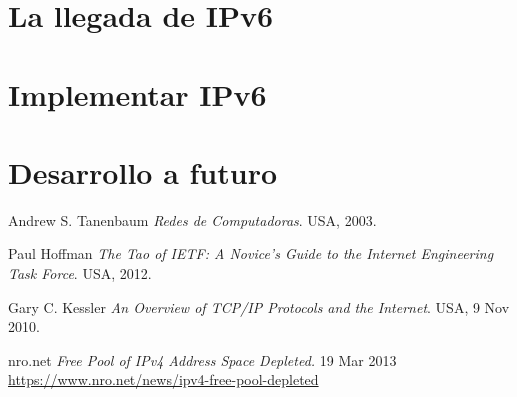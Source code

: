 \documentclass[11pt,a4paper]{article}
\begin{document}
\section{La llegada de IPv6}
\section{Implementar IPv6}
\section{Desarrollo a futuro}

\newpage
\begin{thebibliography}{9}

  Andrew S. Tanenbaum
  \emph{Redes de Computadoras}.
  USA,
  2003.

  Paul Hoffman
  \emph{The Tao of IETF: A Novice's Guide to the Internet Engineering Task Force}.
  USA,
  2012.
		
  Gary C. Kessler
  \emph{An Overview of TCP/IP Protocols and the Internet}.
  USA,
  9 Nov 2010.
		
 nro.net
 \emph{Free Pool of IPv4 Address Space Depleted.} 
 19 Mar 2013\\
	\url{https://www.nro.net/news/ipv4-free-pool-depleted}		
		
\end{thebibliography}
\end{document}

